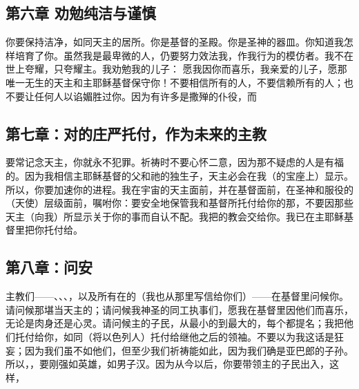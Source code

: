 
\subsection{第六章 劝勉纯洁与谨慎}

你要保持洁净，如同天主的居所。你是基督的圣殿。你是圣神的器皿。你知道我怎样培育了你。虽然我是最卑微的人，仍要努力效法我，作我行为的模仿者。我不在世上夸耀，只夸耀主。我劝勉我的儿子：  愿我因你而喜乐，我亲爱的儿子，愿那唯一无生的天主和主耶稣基督保守你！不要相信所有的人，不要信赖所有的人；也不要让任何人以谄媚胜过你。因为有许多是撒殚的仆役，而 \par


\subsection{第七章：对的庄严托付，作为未来的主教}

要常记念天主，你就永不犯罪。祈祷时不要心怀二意，因为那不疑虑的人是有福的。因为我相信主耶稣基督的父和祂的独生子，天主必会在我（的宝座上）显示。所以，你要加速你的进程。我在宇宙的天主面前，并在基督面前，在圣神和服役的（天使）层级面前，嘱咐你：要安全地保管我和基督所托付给你的那，不要因那些天主（向我）所显示关于你的事而自认不配。我把的教会交给你。我已在主耶稣基督里把你托付给。\par


\subsection{第八章：问安}

主教们——、、、，以及所有在的（我也从那里写信给你们）——在基督里问候你。请问候那堪当天主的；请问候我神圣的同工执事们，愿我在基督里因他们而喜乐，无论是肉身还是心灵。请问候主的子民，从最小的到最大的，每个都提名；我把他们托付给你，如同（将以色列人）托付给继他之后的领袖。不要以为我这话是狂妄；因为我们虽不如他们，但至少我们祈祷能如此，因为我们确是亚巴郎的子孙。所以，，要刚强如英雄，如男子汉。因为从今以后，你要带领主的子民出入，这样， \par

